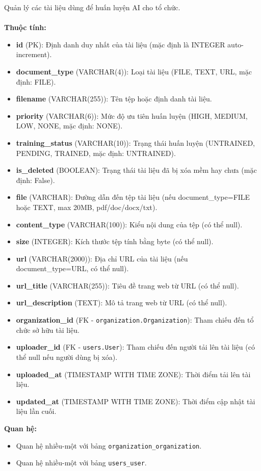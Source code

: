  Quản lý các tài liệu dùng để huấn luyện AI cho tổ chức. \\\\
\indent\textbf{Thuộc tính:}
\begin{itemize}
    \item \textbf{id} (PK): Định danh duy nhất của tài liệu (mặc định là INTEGER auto-increment).
    \item \textbf{document\_type} (VARCHAR(4)): Loại tài liệu (FILE, TEXT, URL, mặc định: FILE).
    \item \textbf{filename} (VARCHAR(255)): Tên tệp hoặc định danh tài liệu.
    \item \textbf{priority} (VARCHAR(6)): Mức độ ưu tiên huấn luyện (HIGH, MEDIUM, LOW, NONE, mặc định: NONE).
    \item \textbf{training\_status} (VARCHAR(10)): Trạng thái huấn luyện (UNTRAINED, PENDING, TRAINED, mặc định: UNTRAINED).
    \item \textbf{is\_deleted} (BOOLEAN): Trạng thái tài liệu đã bị xóa mềm hay chưa (mặc định: False).
    \item \textbf{file} (VARCHAR): Đường dẫn đến tệp tài liệu (nếu document\_type=FILE hoặc TEXT, max 20MB, pdf/doc/docx/txt).
    \item \textbf{content\_type} (VARCHAR(100)): Kiểu nội dung của tệp (có thể null).
    \item \textbf{size} (INTEGER): Kích thước tệp tính bằng byte (có thể null).
    \item \textbf{url} (VARCHAR(2000)): Địa chỉ URL của tài liệu (nếu document\_type=URL, có thể null).
    \item \textbf{url\_title} (VARCHAR(255)): Tiêu đề trang web từ URL (có thể null).
    \item \textbf{url\_description} (TEXT): Mô tả trang web từ URL (có thể null).
    \item \textbf{organization\_id} (FK - \texttt{organization.Organization}): Tham chiếu đến tổ chức sở hữu tài liệu.
    \item \textbf{uploader\_id} (FK - \texttt{users.User}): Tham chiếu đến người tải lên tài liệu (có thể null nếu người dùng bị xóa).
    \item \textbf{uploaded\_at} (TIMESTAMP WITH TIME ZONE): Thời điểm tải lên tài liệu.
    \item \textbf{updated\_at} (TIMESTAMP WITH TIME ZONE): Thời điểm cập nhật tài liệu lần cuối.
\end{itemize}
\textbf{Quan hệ:}
\begin{itemize}
    \item Quan hệ nhiều-một với bảng \texttt{organization\_organization}.
    \item Quan hệ nhiều-một với bảng \texttt{users\_user}.
\end{itemize}

